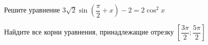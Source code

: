 \begin{ex}
	\begin{condition}
		\begin{enumcols}[label=\asbuk*)]
			\item Решите уравнение \( 3\sqrt{2}\sin\left(\dfrac{\pi}{2}+x\right)-2 = 2\cos^2 x \)
			\item Найдите все корни уравнения, принадлежащие отрезку \( \left[\dfrac{3\pi}{2};\dfrac{5\pi}{2}\right] \)
		\end{enumcols}
	\end{condition}
\end{ex}